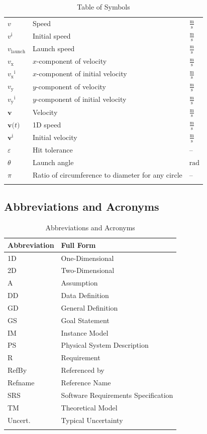 \documentclass[12pt]{article}
\begin{document}
\begin{longtabu}{l X[l] l}
$v$ & Speed & $\frac{\text{m}}{\text{s}}$
\\
${v^{\text{i}}}$ & Initial speed & $\frac{\text{m}}{\text{s}}$
\\
${v_{\text{launch}}}$ & Launch speed & $\frac{\text{m}}{\text{s}}$
\\
${v_{\text{x}}}$ & $x$-component of velocity & $\frac{\text{m}}{\text{s}}$
\\
${{v_{\text{x}}}^{\text{i}}}$ & $x$-component of initial velocity & $\frac{\text{m}}{\text{s}}$
\\
${v_{\text{y}}}$ & $y$-component of velocity & $\frac{\text{m}}{\text{s}}$
\\
${{v_{\text{y}}}^{\text{i}}}$ & $y$-component of initial velocity & $\frac{\text{m}}{\text{s}}$
\\
$\symbf{v}$ & Velocity & $\frac{\text{m}}{\text{s}}$
\\
$\symbf{v}\text{(}t\text{)}$ & 1D speed & $\frac{\text{m}}{\text{s}}$
\\
${\symbf{v}^{\text{i}}}$ & Initial velocity & $\frac{\text{m}}{\text{s}}$
\\
$ε$ & Hit tolerance & --
\\
$θ$ & Launch angle & ${\text{rad}}$
\\
$π$ & Ratio of circumference to diameter for any circle & --
\\
\bottomrule
\caption{Table of Symbols}
\label{Table:ToS}
\end{longtabu}
\subsection{Abbreviations and Acronyms}
\label{Sec:TAbbAcc}
\begin{longtable}{l l}
\toprule
\textbf{Abbreviation} & \textbf{Full Form}
\\
\midrule
\endhead
1D & One-Dimensional
\\
2D & Two-Dimensional
\\
A & Assumption
\\
DD & Data Definition
\\
GD & General Definition
\\
GS & Goal Statement
\\
IM & Instance Model
\\
PS & Physical System Description
\\
R & Requirement
\\
RefBy & Referenced by
\\
Refname & Reference Name
\\
SRS & Software Requirements Specification
\\
TM & Theoretical Model
\\
Uncert. & Typical Uncertainty
\\
\bottomrule
\caption{Abbreviations and Acronyms}
\label{Table:TAbbAcc}
\end{longtable}
\end{document}
